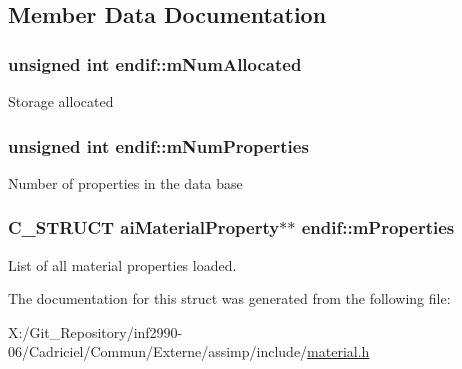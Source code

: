 \subsection{Member Data Documentation}
\hypertarget{structendif_add50ca52ed05564f2187b9893fb1f584}{
\subsubsection[{m\-Num\-Allocated}]{\setlength{\rightskip}{0pt plus 5cm}unsigned int endif\-::m\-Num\-Allocated}}\label{structendif_add50ca52ed05564f2187b9893fb1f584}
Storage allocated \hypertarget{structendif_a751ff065f0b034cfd9cd08d7bc41d668}{
\subsubsection[{m\-Num\-Properties}]{\setlength{\rightskip}{0pt plus 5cm}unsigned int endif\-::m\-Num\-Properties}}\label{structendif_a751ff065f0b034cfd9cd08d7bc41d668}
Number of properties in the data base \hypertarget{structendif_a95295db8cbd37f02553457d84d65068a}{
\subsubsection[{m\-Properties}]{\setlength{\rightskip}{0pt plus 5cm}C\-\_\-\-S\-T\-R\-U\-C\-T ai\-Material\-Property$\ast$$\ast$ endif\-::m\-Properties}}\label{structendif_a95295db8cbd37f02553457d84d65068a}
List of all material properties loaded. 

The documentation for this struct was generated from the following file\-:\begin{DoxyCompactItemize}
\item 
X\-:/\-Git\-\_\-\-Repository/inf2990-\/06/\-Cadriciel/\-Commun/\-Externe/assimp/include/\hyperlink{material_8h}{material.\-h}\end{DoxyCompactItemize}
